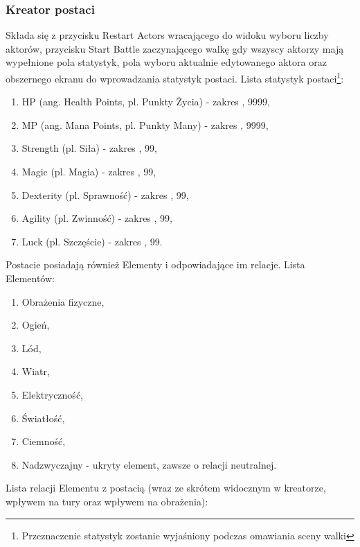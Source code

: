 \documentclass{SGGW-thesis}
\begin{document}
\subsubsection{Kreator postaci}
Składa się z przycisku Restart Actors wracającego do widoku wyboru liczby aktorów, przycisku Start Battle zaczynającego walkę gdy wszyscy aktorzy mają wypełnione pola statystyk, pola wyboru aktualnie edytowanego aktora oraz obszernego ekranu do wprowadzania statystyk postaci.
Lista statystyk postaci\footnote{Przeznaczenie statystyk zostanie wyjaśniony podczas omawiania sceny walki}:
\begin{enumerate}
  \item{HP (ang. Health Points, pl. Punkty Życia) - zakres , 9999\textrangle},
  \item{MP (ang. Mana Points, pl. Punkty Many) - zakres , 9999\textrangle},
  \item{Strength (pl. Siła) - zakres , 99\textrangle},
  \item{Magic (pl. Magia) - zakres , 99\textrangle},
  \item{Dexterity (pl. Sprawność) - zakres , 99\textrangle},
  \item{Agility (pl. Zwinność) - zakres , 99\textrangle},
  \item{Luck (pl. Szczęście) - zakres , 99\textrangle}.
\end{enumerate}
\pagebreak
Postacie posiadają również Elementy i odpowiadające im relacje. Lista Elementów:
\begin{enumerate}
  \item{Obrażenia fizyczne},
  \item{Ogień},
  \item{Lód},
  \item{Wiatr},
  \item{Elektryczność},
  \item{Światłość},
  \item{Ciemność},
  \item{Nadzwyczajny - ukryty element, zawsze o relacji neutralnej}.
\end{enumerate}
Lista relacji Elementu z postacią (wraz ze skrótem widocznym w kreatorze, wpływem na tury oraz wpływem na obrażenia):
\end{document}
